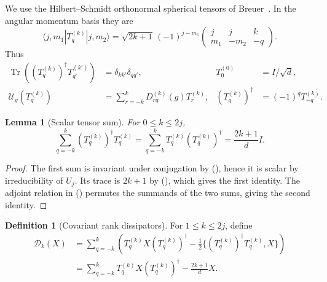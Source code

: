 \documentclass[twoside,10pt]{article}
\numberwithin{equation}{section}
\theoremstyle{slbody}
\newtheorem{lemma}[theorem]{Lemma}
\theoremstyle{definition}
\newtheorem{definition}[theorem]{Definition}
\theoremstyle{remark}
\newcommand{\Tr}{\operatorname{Tr}}
\newcommand{\cD}{\mathcal D}
\newcommand{\cU}{\mathcal U}
\renewcommand{\eqref}[1]{%
  \textup{{\normalfont(\oldstylenums{\ref{#1}}}\normalfont)}}
\begin{document}
We use the Hilbert--Schmidt orthonormal spherical tensors of
Breuer~\cite[Appendix A, Eqs.~(A1)--(A6)]{Breuer2005}.  In the angular
momentum basis they are
\begin{equation}\label{eq:tensor-definition}
 \langle j,m_1|T_q^{(k)}|j,m_2\rangle
 =\sqrt{2k+1}\,(-1)^{j-m_1}
 \begin{pmatrix}
 j&j&k\\ m_1&-m_2&-q
 \end{pmatrix}.
\end{equation}
Thus
\begin{align}
 \Tr\!\left((T_q^{(k)})^\dagger T_{q'}^{(k')}\right)
 &=\delta_{kk'}\delta_{qq'},
 &T_0^{(0)}&=I/\sqrt d,                                      \label{eq:tensor-orthogonality}\\
 \cU_g(T_q^{(k)})
 &=\sum_{r=-k}^k D^{(k)}_{rq}(g)T_r^{(k)},
 &(T_q^{(k)})^\dagger&=(-1)^qT_{-q}^{(k)}.                  \label{eq:tensor-transform}
\end{align}

\begin{lemma}[Scalar tensor sum]\label{lem:scalar-sum}
For \(0\leq k\leq 2j\),
\begin{equation}\label{eq:scalar-sum}
 \sum_{q=-k}^k (T_q^{(k)})^\dagger T_q^{(k)}
 =\sum_{q=-k}^k T_q^{(k)}(T_q^{(k)})^\dagger
 =\frac{2k+1}{d}I.
\end{equation}
\end{lemma}

\begin{proof}
The first sum is invariant under conjugation by
\eqref{eq:tensor-transform}, hence it is scalar by irreducibility of
\(U_j\).  Its trace is \(2k+1\) by
\eqref{eq:tensor-orthogonality}, which gives the first identity.  The
adjoint relation in \eqref{eq:tensor-transform} permutes the summands
of the two sums, giving the second identity.
\end{proof}

\begin{definition}[Covariant rank dissipators]\label{def:dissipators}
For \(1\leq k\leq2j\), define
\begin{align}
 \cD_k(X)
 &=\sum_{q=-k}^k\left(
 T_q^{(k)}X(T_q^{(k)})^\dagger
 -\frac12\{(T_q^{(k)})^\dagger T_q^{(k)},X\}\right)          \label{eq:dissipator-definition}\\
 &=\sum_{q=-k}^kT_q^{(k)}X(T_q^{(k)})^\dagger
 -\frac{2k+1}{d}X.                                           \label{eq:dissipator-simplified}
\end{align}
\end{definition}
\end{document}
